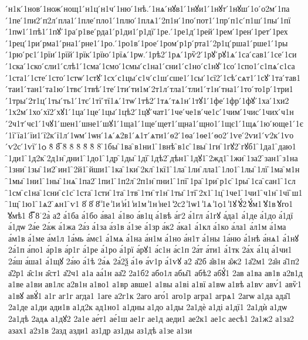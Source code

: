 {́н1к
́1нов
́1нож
́нощ1
́н1ц
́н1ч
́1ню
́1нѣ.
́1нѧ
́нꙋв1
́1нꙋи1
́1нꙋт
́1нꙋш
́1о
́о2м
́1па
́1пе
́1пи2
́п2л
́пла1
́1пле
́пло1
́1плю
́1плѧ1
́2п1н
́1по
́пот1
́1пр
́п1с
́п1ш
́1пы
́1пї
́1пѡ1
́1пѣ1
́1пꙋ
́1ра
́р1ве
́рда1
́р1ди1
́р1дї
́1ре.
́1ре1д
́1рей
́1рем
́1рен
́1рет
́1рех
́1рец
́1ри
́рма1
́рна1
́рне1
́1ро.
́1ро1в
́1рое
́1ром
́р1р
́рта1
́2р1ц
́рша1
́рше1
́1ры
́1рю
́рє1
́1рїи
́1рїй
́1рїк
́1рїю
́1рїѧ
́1рѡ.
́1рѣ2
́1рѧ
́1рѷ2
́1рꙋ
́рꙋ1ѧ
́1са
́сав1
́1се
́1си
́1ска
́1ско
́сли1
́слѣ1
́1сма
́1смо
́1смы
́с1на1
́сни1
́с1но
́с1нꙋ
́1со
́1спо1
́с1пѧ
́с1са
́1ста1
́1сте
́1сто
́1стѡ
́1стꙋ
́1сх
́с1цы
́с1ч
́с1ш
́сше1
́1сы
́1сї2
́1сѣ
́сѧт1
́1сꙋ
́1та
́тав1
́таи1
́тан1
́та1ю
́1твє
́1твѣ
́1те
́1ти
́ти1м
́2т1л
́тла1
́тли1
́т1н
́тна1
́1то
́то1р
́1три1
́1тры
́2т1ц
́1ты
́ть1
́1тє
́1тї
́тї1ѧ
́1тѡ
́1тѣ2
́1тѧ
́тѧ1н
́1тꙋ1
́1фе
́1фр
́1фꙋ
́1ха
́1хи2
́1х2м
́1хо
́хї2
́хꙋ1
́1ца
́1це
́1цы
́1цѣ2
́1цꙋ
́чат1
́1че
́че1в
́че1с
́1чим
́1чис
́1чих
́ч1н
́2ч1т
́чє1
́1чꙋ1
́шен1
́шне1
́шꙋ1
́1ща1
́1ще
́щет1
́щна1
́щно1
́1щє1
́1щѧ
́1ю
́юще1
́1є
́1ї
́їа1
́їи1
́ї2к
́ї1л
́1ѡм
́1ѡн
́1ѧ
́ѧ2в1
́ѧ1т
́ѧти1
́ѳ2
́1ѳа
́1ѳе1
́ѳо2
́1ѵе
́2ѵи1
́ѵ2к
́1ѵо
́ѵ2с
́1ѵї
́1ѻ
8̂
8̅
8̆
8̇
8̈
8̋
8̏
8̑
̑1бы
̑1ва
̑в1ни1
̑1внѣ
̑в1с
̑1вы
̑1ги
̑1гꙋ2
̑гꙋб1
̑1да1
̑даю1
̑1ди1
̑1д2к
̑2д1н
̑дни1
̑1до1
̑1др
̑1ды
̑1дї
̑1дѣ2
̑дѣн1
̑1дꙋ1
̑2жд1
̑1жи
̑1за2
̑зан1
̑з1на
̑1зни
̑1зы
̑1и2
̑ин1
̑2й1
̑йши1
̑1ка
̑1ки
̑2кл
̑1кї1
̑1ла
̑1ли
̑лла1
̑1ло1
̑1лы
̑1лї
̑1ма
̑м1н
̑1мы
̑1ни1
̑1ны
̑1нѧ
̑1па2
̑1пи1
̑1п2л
̑2п1н
̑пни1
̑1пї
̑1ра
̑1ри
̑р1с
̑1ры
̑1са
̑сан1
̑1сл
̑1см
̑с1на
̑1сни
̑с1с
̑1ста
̑1сти
̑1та
̑1тв
̑1ти
̑т1н
̑1ты
̑1тї
̑2х1
̑1ц
̑1че1
̑1чи1
̑ч1н
̑1чї
̑ш1
̑1щ
̑1ю1
̑1ѧ2
̑ѧн1
̑ѵ1
8̓
8̔
8̾
̾1е
̾1и
̾и́1
̾и1м
̾1н
̾не1
̾2с2
̾1ѡ1
̾1ѧ
̾1ѻ1
̾1ꙋ
̾ꙋ́2
̾ꙋ́м1
̾ꙋ1в
̾ꙋго1
̾ꙋмѣ1
8̿
8͘
2а̀
а2́
а́1ба
а́1бо
а́ва1
а́1во
а́в1ц
а́1вѣ
а́г2
а́1гл
а́1гꙋ
а́да1
а́1де
а́1до
а́1дї
а́1дѡ
2а́е
2а́ж
а́1жа
2а́з
а́1за
а́з1в
а́1зе
а́1зр
а́к2
а́ка1
а́1кл
а́1ко
а́ла1
а́л1м
а́1ма
а́м1в
а́1ме
а́м1л
1а́мь
а́мє1
а́1мѧ
а́1на
а́н1м
а́1но
а́н1т
а́1ны
1а́ню
а́1нѣ
а́нѧ1
а́1нꙋ
2а́1п
а́по1
а́р1в
а́р1г
а́1ре
а́1ро
а́1рї
а́рꙋ1
а́с1н
а́с1п
2а́т
а́ти1
а́1тк
2а́х
а́1ц
а́1чи1
2а́ш
а́ша1
а́1щꙋ
2а́ю
а́1ѣ
2а́ѧ
2а́2ѯ
а́1ѳ
а́ѵ1р
а́1ѵꙋ
а2̑
а̑2б
а̑в1н
а̑ж2
1а̑2м1
2а̑н
а̑1п2
а̑2р1
а̑с1н
а̑ст1
а̑2ч1
а1а
аа́1н
аа̑2
2а1б2
або1л
абы̑1
абѣ2
абꙋ́1
2ав
а1ва
ав1в
а2в1д
а1ве
а1ви
ав1лє
а2в1н
а1во1
а1вр
авше1
а1вы
а1ві
а1вї
а1вѡ
а1вѣ
а1вѵ
авѵ́1
авѷ1
а1вꙋ
авꙋ́1
а1г
аг1г
агда1
1аге
а2г1к
2аго
аго́1
аго1р
агра1
агрѧ1
2агѡ
а1да
ада̑1
2а1де
а1ди
ади1в
а1д2к
ад1но1
а1дны
а1до
а1ды
2а1дѐ
а1ді
а1дї1
2а1дѝ
а1дѡ
2а1дѣ
2адѧ
а1дꙋ2
2а1е
ае́т1
ае́1ш
ае1г
ае1д
аеди1
ае2к1
ае1с
аесѣ1
2а1ж2
а1за2
азах1
а2з1в
2азд
азди1
аз1др
аз1ды
аз1дѣ
а1зе
а1зи
}
